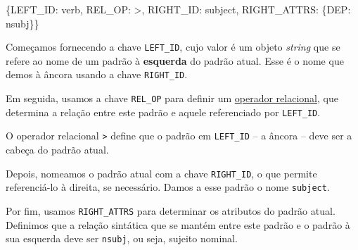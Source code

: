 \documentclass[
  brazilian,
]{article}
\newenvironment{Shaded}{}{}
\newcommand{\NormalTok}[1]{#1}
\newcommand{\StringTok}[1]{\textcolor[rgb]{0.25,0.44,0.63}{#1}}
\begin{document}
\begin{Shaded}
\begin{Highlighting}[]
\NormalTok{\{}\StringTok{\textquotesingle{}LEFT\_ID\textquotesingle{}}\NormalTok{: }\StringTok{\textquotesingle{}verb\textquotesingle{}}\NormalTok{, }\StringTok{\textquotesingle{}REL\_OP\textquotesingle{}}\NormalTok{: }\StringTok{\textquotesingle{}\textgreater{}\textquotesingle{}}\NormalTok{, }\StringTok{\textquotesingle{}RIGHT\_ID\textquotesingle{}}\NormalTok{: }\StringTok{\textquotesingle{}subject\textquotesingle{}}\NormalTok{, }\StringTok{\textquotesingle{}RIGHT\_ATTRS\textquotesingle{}}\NormalTok{: \{}\StringTok{\textquotesingle{}DEP\textquotesingle{}}\NormalTok{: }\StringTok{\textquotesingle{}nsubj\textquotesingle{}}\NormalTok{\}\}}
\end{Highlighting}
\end{Shaded}

Começamos fornecendo a chave \texttt{LEFT\_ID}, cujo valor é um objeto
\emph{string} que se refere ao nome de um padrão à \textbf{esquerda} do
padrão atual. Esse é o nome que demos à âncora usando a chave
\texttt{RIGHT\_ID}.

Em seguida, usamos a chave \texttt{REL\_OP} para definir um
\href{https://spacy.io/api/dependencymatcher\#patterns}{operador
relacional}, que determina a relação entre este padrão e aquele
referenciado por \texttt{LEFT\_ID}.

O operador relacional \texttt{\textgreater{}} define que o padrão em
\texttt{LEFT\_ID} -- a âncora -- deve ser a cabeça do padrão atual.

Depois, nomeamos o padrão atual com a chave \texttt{RIGHT\_ID}, o que
permite referenciá-lo à direita, se necessário. Damos a esse padrão o
nome \texttt{subject}.

Por fim, usamos \texttt{RIGHT\_ATTRS} para determinar os atributos do
padrão atual. Definimos que a relação sintática que se mantém entre este
padrão e o padrão à sua esquerda deve ser \texttt{nsubj}, ou seja,
sujeito nominal.
\end{document}
